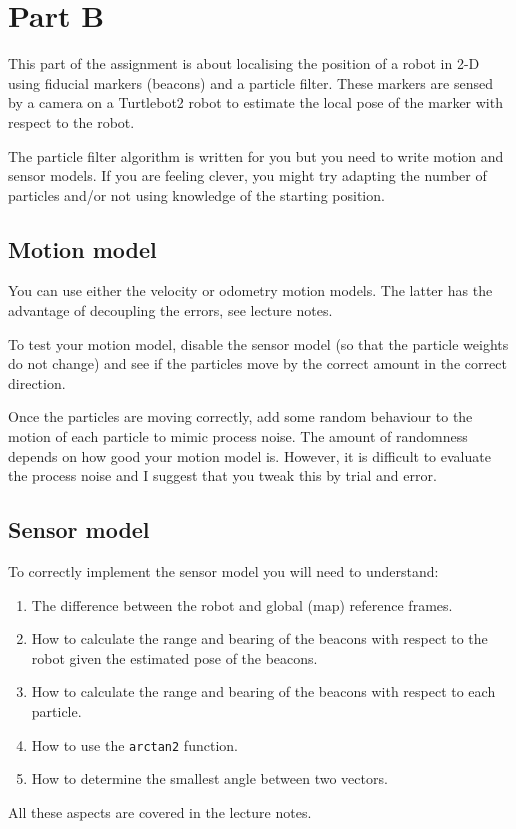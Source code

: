 \documentclass[a4paper, 12]{article}
\newcommand{\code}[1]{\texttt{#1}}
\begin{document}
\section{Part B}

This part of the assignment is about localising the position of a
robot in 2-D using fiducial markers (beacons) and a particle filter.
These markers are sensed by a camera on a Turtlebot2 robot to estimate
the local pose of the marker with respect to the robot.


The particle filter algorithm is written for you but you need to write
motion and sensor models.  If you are feeling clever, you might try
adapting the number of particles and/or not using knowledge of the
starting position.


\subsection{Motion model}

You can use either the velocity or odometry motion models.  The latter
has the advantage of decoupling the errors, see lecture notes.

To test your motion model, disable the sensor model (so that the
particle weights do not change) and see if the particles move by the
correct amount in the correct direction.

Once the particles are moving correctly, add some random behaviour to
the motion of each particle to mimic process noise.  The amount of
randomness depends on how good your motion model is.  However, it is
difficult to evaluate the process noise and I suggest that you tweak
this by trial and error.


\subsection{Sensor model}


To correctly implement the sensor model you will need to understand:
%
\begin{enumerate}
\item The difference between the robot and global (map) reference frames.

\item How to calculate the range and bearing of the beacons with
  respect to the robot given the estimated pose of the beacons.

\item How to calculate the range and bearing of the beacons with
  respect to each particle.

\item How to use the \code{arctan2} function.

\item How to determine the smallest angle between two vectors.  
\end{enumerate}
%
All these aspects are covered in the lecture notes.
\end{document}
